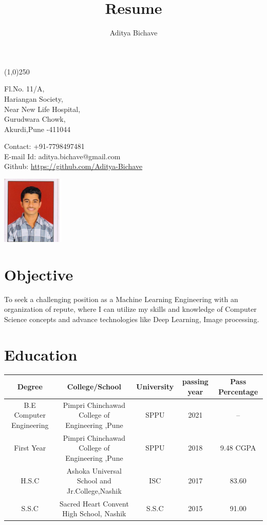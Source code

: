 \documentclass[10pt]{article}
\makeatletter
\renewcommand{\maketitle}{
\begin{center}
{\LARGE\bfseries
\theauthor}

\vspace{.25em}
\line(1,0){250}
\end{center}
\begin{multicols}{2}
\noindent
Fl.No. 11/A,\\
Hariangan Society,\\
Near New Life Hospital,\\
Gurudwara Chowk,\\
Akurdi,Pune -411044\\

\columnbreak
\begin{flushright}
Contact: +91-7798497481\\
E-mail Id: aditya.bichave@gmail.com\\
Github: \url{https://github.com/Aditya-Bichave}
\end{flushright}
\noindent
\hspace{10em}
\includegraphics[width = 8em]{Aditya.jpg}

\end{multicols}



}
\makeatother
\begin{document}
\title{Resume}
\author{Aditya Bichave}
\maketitle

\section{Objective}

To seek a challenging position as a Machine Learning Engineering with an organization of repute, where I can utilize my skills and knowledge of Computer Science concepts and advance technologies like Deep Learning, Image processing.

\section{Education}

\begin{tabular}[8pt]{| c | c | c | c | c |}
\hline
	Degree & College/School & University & passing year & Pass Percentage\\
\hline
	B.E Computer Engineering & Pimpri Chinchawad College of Engineering ,Pune & SPPU & 2021 & -- \\
\hline
	First Year & Pimpri Chinchawad College of Engineering ,Pune & SPPU & 2018 & 9.48 CGPA \\
\hline
	H.S.C & Ashoka Universal School and Jr.College,Nashik & ISC & 2017 & 83.60 \\
\hline
	S.S.C & Sacred Heart Convent High School, Nashik & S.S.C & 2015 & 91.00\\
\hline
\end{tabular} 
\end{document}
